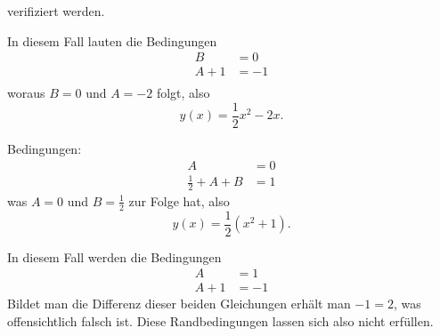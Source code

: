 \begin{loesung}
\begin{teilaufgaben}
verifiziert werden.
\item In diesem Fall lauten die Bedingungen
\begin{align*}
B&=0\\
A+1&=-1\\
\end{align*}
woraus $B=0$ und $A=-2$ folgt, also
\[
y(x)=\frac12x^2-2x.
\]
\item
Bedingungen:
\begin{align*}
A&=0\\
\frac12+A+B&=1
\end{align*}
was $A=0$ und $B=\frac12$ zur Folge hat, also
\[
y(x)=\frac12(x^2+1).
\]
\item In diesem Fall werden die Bedingungen
\begin{align*}
A&=1\\
A+1&=-1
\end{align*}
Bildet man die Differenz dieser beiden Gleichungen
erhält man $-1=2$, was offensichtlich falsch ist. Diese
Randbedingungen lassen sich also nicht erfüllen.
\qedhere
\end{teilaufgaben}
\end{loesung}
